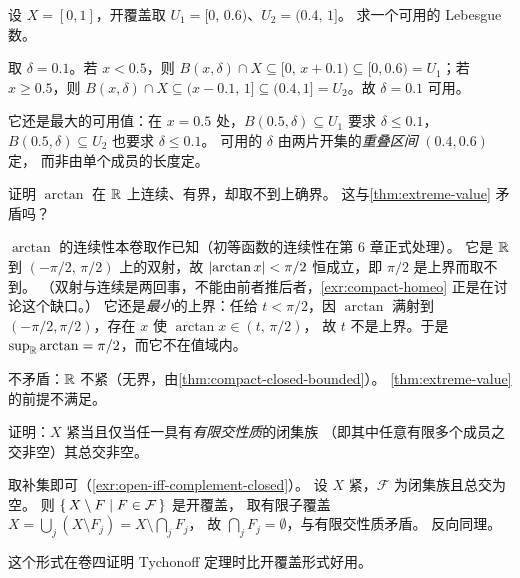 \begin{exercise}[例行]
  \label{exr:lebesgue-number-concrete}
  设 \(X = [0,1]\)，开覆盖取 \(U_{1} = [0,\,0.6)\)、\(U_{2} = (0.4,\,1]\)。
  求一个可用的 Lebesgue 数。
  \begin{solution}
    取 \(\delta = 0.1\)。若 \(x < 0.5\)，则 \(B(x,\delta) \cap X \subseteq [0,\,x+0.1)
    \subseteq [0,0.6) = U_{1}\)；若 \(x \ge 0.5\)，则 \(B(x,\delta) \cap X
    \subseteq (x-0.1,\,1] \subseteq (0.4,1] = U_{2}\)。故 \(\delta=0.1\) 可用。

    它还是最大的可用值：在 \(x=0.5\) 处，\(B(0.5,\delta) \subseteq U_{1}\) 要求
    \(\delta \le 0.1\)，\(B(0.5,\delta) \subseteq U_{2}\) 也要求 \(\delta \le 0.1\)。
    可用的 \(\delta\) 由两片开集的\emph{重叠区间} \((0.4,0.6)\) 定，
    而非由单个成员的长度定。
  \end{solution}
\end{exercise}

\begin{exercise}[例行]
  \label{exr:arctan-no-max}
  证明 \(\arctan\) 在 \(\mathbb{R}\) 上连续、有界，却取不到上确界。
  这与\cref{thm:extreme-value} 矛盾吗？
  \begin{solution}
    \(\arctan\) 的连续性本卷取作已知（初等函数的连续性在第 6 章正式处理）。
    它是 \(\mathbb{R}\) 到 \((-\pi/2,\,\pi/2)\) 上的双射，故 \(\lvert\arctan x\rvert < \pi/2\)
    恒成立，即 \(\pi/2\) 是上界而取不到。
    （双射与连续是两回事，不能由前者推后者，\cref{exr:compact-homeo}
    正是在讨论这个缺口。）
    它还是\emph{最小}的上界：任给 \(t<\pi/2\)，因 \(\arctan\) 满射到
    \((-\pi/2,\pi/2)\)，存在 \(x\) 使 \(\arctan x \in (t,\,\pi/2)\)，
    故 \(t\) 不是上界。于是 \(\sup_{\mathbb{R}}\arctan = \pi/2\)，而它不在值域内。

    不矛盾：\(\mathbb{R}\) 不紧（无界，由\cref{thm:compact-closed-bounded}）。
    \cref{thm:extreme-value} 的前提不满足。
  \end{solution}
\end{exercise}

\begin{exercise}[结构]
  \label{exr:fip}
  证明：\(X\) 紧当且仅当任一具有\emph{有限交性质}的闭集族
  （即其中任意有限多个成员之交非空）其总交非空。
  \begin{solution}
    取补集即可（\cref{exr:open-iff-complement-closed}）。
    设 \(X\) 紧，\(\mathcal{F}\) 为闭集族且总交为空。
    则 \(\left\{\,X \setminus F \;\middle|\; F \in \mathcal{F}\,\right\}\) 是开覆盖，
    取有限子覆盖 \(X = \bigcup_{j}(X \setminus F_{j}) = X \setminus \bigcap_{j}F_{j}\)，
    故 \(\bigcap_{j} F_{j} = \emptyset\)，与有限交性质矛盾。
    反向同理。

    这个形式在卷四证明 Tychonoff 定理时比开覆盖形式好用。
  \end{solution}
\end{exercise}

